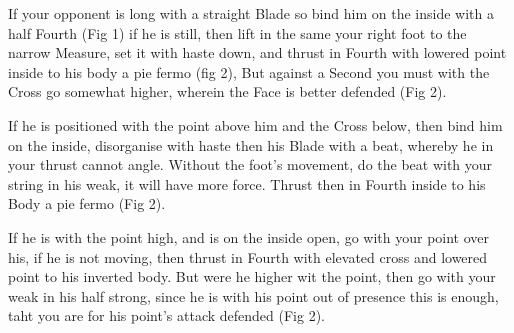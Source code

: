 \newpage


\newpage


\exercise{}
If your opponent is long with a straight Blade so bind him on the
inside with a half Fourth (Fig 1) if he is still, then lift in the
same your right foot to the narrow Measure, set it with haste down,
and thrust in Fourth with lowered point inside to his body a pie fermo
(fig 2), But against a Second you must with the Cross go somewhat
higher, wherein the Face is better defended (Fig 2).

\exercise{}
If he is positioned with the point above him and the Cross below, then
bind him on the inside, disorganise with haste then his Blade with a
beat, whereby he in your thrust cannot angle. Without the foot's
movement, do the beat with your string in his weak, it will have more
force. Thrust then in Fourth inside to his Body a pie fermo (Fig 2).


\exercise{}
If he is with the point high, and is on the inside open, go with your
point over his, if he is not moving, then thrust in Fourth with
elevated cross and lowered point to his inverted body. But were he
higher wit the point, then go with your weak in his half strong, since
he is with his point out of presence this is enough, taht you are for
his point's attack defended (Fig 2).
